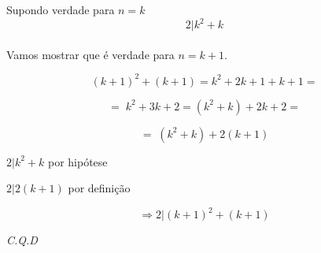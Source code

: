 Supondo verdade para $ n = k $ \\

$$ 2|k^2 + k $$ \\

Vamos mostrar que é verdade para $ n = k + 1 $.

$$ (k + 1)^2 + (k + 1) = k^2 + 2k + 1 + k + 1 = $$ 

$$ = \; k^2 + 3k + 2 = (k^2 + k) + 2k + 2 = $$ 

$$ = \; (k^2 + k) + 2(k + 1)$$ 

$ 2|k^2 + k $ por hipótese 

$ 2|2(k + 1) $ por definição 

$$ \Rightarrow 2 | (k + 1 )^2 + (k + 1) $$

\begin{flushright}
	\textit{C.Q.D} 
\end{flushright}
